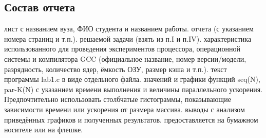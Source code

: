 \subsection{Состав отчета}
\begin{enumerate}
     лист с названием вуза, ФИО студента и названием работы.
     отчета (с указанием номера страниц и т.п.).
     решаемой задачи (взять из п.I и п.IV).
     характеристика использованного для проведения экспериментов процессора, операционной системы и компилятора GCC (официальное название, номер версии/модели, разрядность, количество ядер, ёмкость ОЗУ, размер кэша и т.п.).
     текст программы lab1.c в виде отдельного файла.
     значений и графики функций seq(N), par-K(N) с указанием времени выполнения и величины параллельного ускорения. Предпочтительно использовать столбчатые гистограммы, показывающие зависимости времени или ускорения от размера массива.
     выводы с анализом приведённых графиков и полученных результатов.
     предоставляется на бумажном носителе или на флешке.
\end{enumerate}
